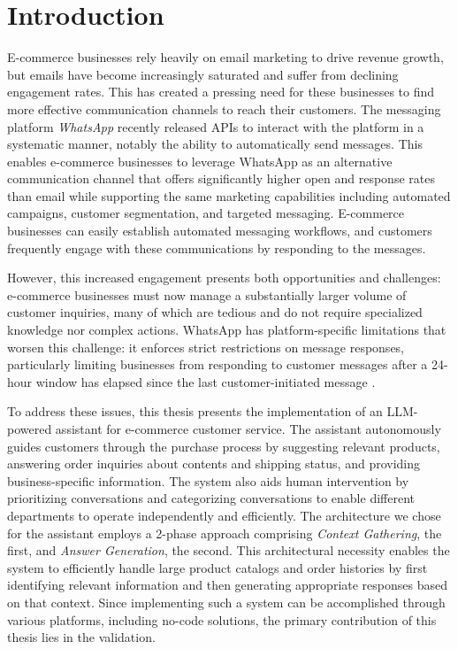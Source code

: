 \chapter{Introduction}
\label{cha:introduction}



E-commerce businesses rely heavily on email marketing to drive revenue growth, but emails have become increasingly saturated and suffer from declining engagement rates.
This has created a pressing need for these businesses to find more effective communication channels to reach their customers.
The messaging platform \textit{WhatsApp} recently released APIs to interact with the platform in a systematic manner, notably the ability to automatically send messages.
This enables e-commerce businesses to leverage WhatsApp as an alternative communication channel that offers significantly higher open and response rates than email while supporting the same marketing capabilities including automated campaigns, customer segmentation, and targeted messaging.
E-commerce businesses can easily establish automated messaging workflows, and customers frequently engage with these communications by responding to the messages.


However, this increased engagement presents both opportunities and challenges: e-commerce businesses must now manage a substantially larger volume of customer inquiries, many of which are tedious and do not require specialized knowledge nor complex actions.
WhatsApp has platform-specific limitations that worsen this challenge: it enforces strict restrictions on message responses, particularly limiting businesses from responding to customer messages after a 24-hour window has elapsed since the last customer-initiated message \cite{wa_policy}.


To address these issues, this thesis presents the implementation of an LLM-powered assistant for e-commerce customer service.
The assistant autonomously guides customers through the purchase process by suggesting relevant products, answering order inquiries about contents and shipping status, and providing business-specific information.
The system also aids human intervention by prioritizing conversations and categorizing conversations to enable different departments to operate independently and efficiently.
The architecture we chose for the assistant employs a 2-phase approach comprising \textit{Context Gathering}, the first, and \textit{Answer Generation}, the second.
This architectural necessity enables the system to efficiently handle large product catalogs and order histories by first identifying relevant information and then generating appropriate responses based on that context.
Since implementing such a system can be accomplished through various platforms, including no-code solutions, the primary contribution of this thesis lies in the validation.

